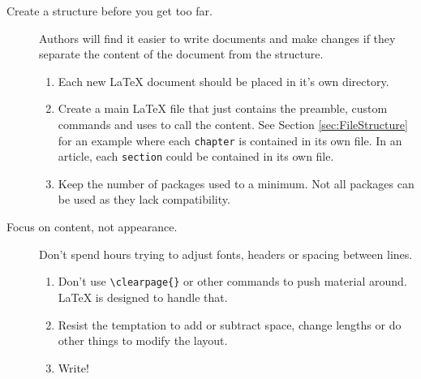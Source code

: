 \begin{description}
\item[Create a structure before you get too far.] Authors will find it easier to write documents and make changes if they separate the content of the document from the structure.
\begin{enumerate}
\item Each new LaTeX document should be placed in it's own directory. 
\item Create a main LaTeX file that just contains the preamble, custom commands and uses \verb++ to call the content. See Section \ref{sec:FileStructure} for an example where each \texttt{chapter} is contained in its own file. In an article, each \texttt{section} could be contained in its own file.
\item Keep the number of packages used to a minimum. Not all packages can be used as they lack compatibility.
\end{enumerate}
\item[Focus on content, not appearance.] Don't spend hours trying to adjust fonts, headers or spacing between lines. 
\begin{enumerate}
\item Don't use \verb+\clearpage{}+ or other commands to push material around. LaTeX is designed to handle that. 
\item Resist the temptation to add or subtract space, change lengths or do other things to modify the layout. 
\item Write!
\end{enumerate}
\end{description}
